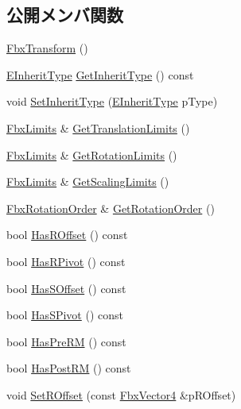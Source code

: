 \subsection*{公開メンバ関数}
\begin{DoxyCompactItemize}
\item 
\hyperlink{class_fbx_transform_af18e2940f5b28aa68e1648236afce60f}{Fbx\+Transform} ()
\item 
\hyperlink{class_fbx_transform_ac1ab8f75b4873723daa68c57f999b10f}{E\+Inherit\+Type} \hyperlink{class_fbx_transform_ad29a1e87720838947b5444937c9326ae}{Get\+Inherit\+Type} () const
\item 
void \hyperlink{class_fbx_transform_a45fed2a2ce79d3be60f8db31303f8e03}{Set\+Inherit\+Type} (\hyperlink{class_fbx_transform_ac1ab8f75b4873723daa68c57f999b10f}{E\+Inherit\+Type} p\+Type)
\item 
\hyperlink{class_fbx_limits}{Fbx\+Limits} \& \hyperlink{class_fbx_transform_aa3ae31f067c3f4e42841867594754e95}{Get\+Translation\+Limits} ()
\item 
\hyperlink{class_fbx_limits}{Fbx\+Limits} \& \hyperlink{class_fbx_transform_af1261d3ffa15c34026ab7df1adb8a403}{Get\+Rotation\+Limits} ()
\item 
\hyperlink{class_fbx_limits}{Fbx\+Limits} \& \hyperlink{class_fbx_transform_a435d21622e8a10efb1a38ef9d2bceb75}{Get\+Scaling\+Limits} ()
\item 
\hyperlink{class_fbx_rotation_order}{Fbx\+Rotation\+Order} \& \hyperlink{class_fbx_transform_a5479e91c17dc9919d411e55287ead9d7}{Get\+Rotation\+Order} ()
\item 
bool \hyperlink{class_fbx_transform_a0f8a508ce59cb0935a8c365c2ff71c10}{Has\+R\+Offset} () const
\item 
bool \hyperlink{class_fbx_transform_af7c5853f01369b5505255c8a92aa8ef7}{Has\+R\+Pivot} () const
\item 
bool \hyperlink{class_fbx_transform_a09e89d031fec95246efe655aee157bac}{Has\+S\+Offset} () const
\item 
bool \hyperlink{class_fbx_transform_a92416fa3e515aea2f5b52e0304a21a05}{Has\+S\+Pivot} () const
\item 
bool \hyperlink{class_fbx_transform_a60f56f77627047df738fc566fa8a35d8}{Has\+Pre\+RM} () const
\item 
bool \hyperlink{class_fbx_transform_ae853dc92acb8600acf2dc7cb29874118}{Has\+Post\+RM} () const
\item 
void \hyperlink{class_fbx_transform_a9711194d9ef07112e7281328d0f0f9a8}{Set\+R\+Offset} (const \hyperlink{class_fbx_vector4}{Fbx\+Vector4} \&p\+R\+Offset)

\end{DoxyCompactItemize}
